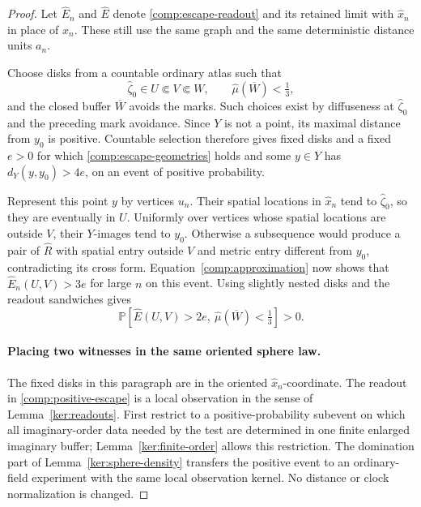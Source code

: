 \documentclass[11pt]{article}
\numberwithin{equation}{section}
\theoremstyle{definition}
\theoremstyle{remark}
\newcommand{\1}{\mathbf 1}
\begin{document}
\begin{proof}
Let $\widehat E_n$ and $\widehat E$ denote
\eqref{comp:escape-readout} and its retained limit with
$\widehat x_n$ in place of $x_n$.  These still use the same graph
and the same deterministic distance units $a_n$.

Choose disks from a countable ordinary atlas such that
\begin{equation}
 \label{comp:escape-geometries}
 \widehat\zeta_0\in U\Subset V\Subset W,\qquad
 \widehat\mu(\overline W)<\tfrac13,
\end{equation}
and the closed buffer $\overline W$ avoids the marks.  Such choices
exist by diffuseness at $\widehat\zeta_0$ and the preceding mark avoidance.
Since $Y$ is not a point, its maximal distance from $y_0$ is
positive.  Countable selection therefore gives fixed disks and
a fixed $e>0$ for which \eqref{comp:escape-geometries} holds and
some $y\in Y$ has $d_Y(y,y_0)>4e$, on an event of positive
probability.

Represent this point $y$ by vertices $u_n$.  Their spatial
locations in $\widehat x_n$ tend to $\widehat\zeta_0$, so they are
eventually in $U$.  Uniformly
over vertices whose spatial locations are outside $V$, their
$Y$-images tend to $y_0$.  Otherwise a subsequence would produce
a pair of $\widehat R$ with spatial entry outside $V$ and metric
entry different from $y_0$, contradicting its cross form.
Equation~\eqref{comp:approximation} now shows that
$\widehat E_n(U,V)>3e$ for large $n$ on this event.
Using slightly nested disks and the readout sandwiches gives
\begin{equation}
 \label{comp:positive-escape}
 \mathbb P\left[\widehat E(U,V)>2e,\
          \widehat\mu(\overline W)<\tfrac13\right]>0.
\end{equation}

\paragraph{Placing two witnesses in the same oriented sphere law.}
The fixed disks in this paragraph are in the oriented
$\widehat x_n$-coordinate.  The readout in
\eqref{comp:positive-escape} is a local observation
in the sense of Lemma~\ref{ker:readouts}.  First restrict to a
positive-probability subevent on which all imaginary-order data
needed by the test are determined in one finite enlarged
imaginary buffer; Lemma~\ref{ker:finite-order} allows this
restriction.  The domination part of
Lemma~\ref{ker:sphere-density} transfers the positive event to an
ordinary-field experiment with the same local observation
kernel.  No distance or clock normalization is changed.


\end{proof}
\end{document}
